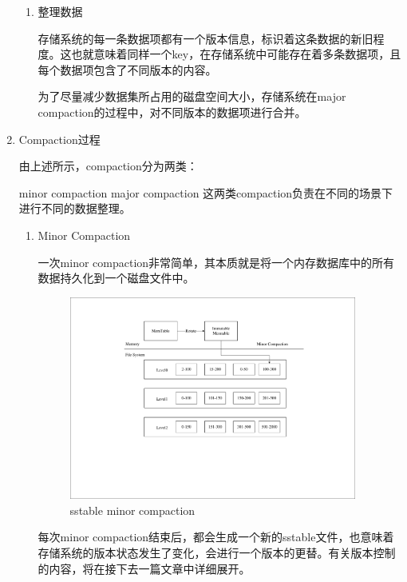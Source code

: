 \begin{enumerate}
\begin{enumerate}
				\item 整理数据
				
				存储系统的每一条数据项都有一个版本信息，标识着这条数据的新旧程度。这也就意味着同样一个key，在存储系统中可能存在着多条数据项，且每个数据项包含了不同版本的内容。
				
				为了尽量减少数据集所占用的磁盘空间大小，存储系统在major compaction的过程中，对不同版本的数据项进行合并。
				
				
				
			\end{enumerate}

			\item Compaction过程 
			
			由上述所示，compaction分为两类：
				
				minor compaction
				major compaction
				这两类compaction负责在不同的场景下进行不同的数据整理。
			\begin{enumerate}
				\item Minor Compaction
				
				一次minor compaction非常简单，其本质就是将一个内存数据库中的所有数据持久化到一个磁盘文件中。
				
				\begin{figure}[H]
					\centering
					\includegraphics[width=0.95\textwidth]{pdf/minor_compaction.pdf}
					\caption{sstable minor compaction}
					\label{sstable_minor_compaction}
				\end{figure}
				
				每次minor compaction结束后，都会生成一个新的sstable文件，也意味着存储系统的版本状态发生了变化，会进行一个版本的更替。有关版本控制的内容，将在接下去一篇文章中详细展开。
				

\end{enumerate}
\end{enumerate}
